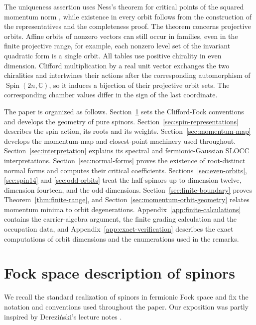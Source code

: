 \documentclass{article}
\theoremstyle{definition}
\theoremstyle{remark}
\newcommand{\C}{\mathbb C}
\newcommand{\Spin}{\operatorname{Spin}}
\begin{document}
The uniqueness assertion uses Ness's theorem for critical points of the
squared momentum norm \cite[Theorem~7.1]{Ness1984}, while existence
in every orbit follows from the construction of the representatives and
the completeness proof. The theorem concerns projective orbits. Affine orbits of nonzero vectors can still occur in families, even in the finite projective range, for example, each nonzero level set of the
invariant quadratic form is a single orbit. All tables use positive chirality in even dimension. Clifford multiplication
by a real unit vector exchanges the two chiralities and intertwines their
actions after the corresponding automorphism of $\Spin(2n,\C)$, so it
induces a bijection of their projective orbit sets. The corresponding chamber values differ in the sign of the last coordinate.

The paper is organized as follows. 
Section~\ref{sec:fock-model} sets the
Clifford-Fock conventions and develops the geometry of pure spinors.
Section~\ref{sec:spin-representations} describes the spin action, its roots
and its weights.  Section~\ref{sec:momentum-map} develops the momentum-map and
closest-point machinery used throughout.  Section~\ref{sec:interpretation} explains its spectral and fermionic-Gaussian SLOCC interpretations. Section~\ref{sec:normal-forms} proves the existence of root-distinct
normal forms and computes their critical coefficients.
Sections~\ref{sec:even-orbits}, \ref{sec:spin14} and \ref{sec:odd-orbits}
treat the half-spinors up to dimension twelve, dimension fourteen, and the
odd dimensions. Section~\ref{sec:finite-boundary} proves
Theorem~\ref{thm:finite-range}, and Section~\ref{sec:momentum-orbit-geometry}
relates momentum minima to orbit degenerations.
Appendix~\ref{app:finite-calculations} contains the carrier-algebra
argument, the finite grading calculation and the occupation data, and Appendix~\ref{app:exact-verification}
describes the exact computations of orbit dimensions and the enumerations
used in the remarks.



\section{Fock space description of spinors}
\label{sec:fock-model}

We recall the standard realization of spinors in fermionic Fock space and fix the notation and conventions used throughout the paper.
Our exposition was partly inspired by Derezi{\'n}ski's lecture notes \cite{Derezinski2023Clifford}.
\end{document}

